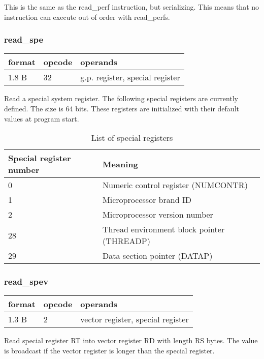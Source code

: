 \documentclass[forwardcom.tex]{subfiles}
\begin{document}
This is the same as the read\_perf instruction, but serializing. This means that no instruction can execute out of order with read\_perfs.

\subsubsection{read\_spe}
\label{table:readSpeInstruction}
\begin{tabular}{|p{12mm}|p{12mm}|p{110mm}|}
\hline
\bfseries format & \bfseries opcode & \bfseries operands \\ \hline
1.8 B & 32 & g.p. register, special register \\ \hline
\end{tabular}
\vspace{2mm}

Read a special system register. The following special registers are currently defined. The size is 64 bits. These registers are initialized with their default values at program start.

\begin{longtable} {|p{15mm}|p{100mm}|}
\caption{List of special registers} 
\label{table:specialRegisters} \\
\endfirsthead
\endhead
\hline
\bfseries Special register number & \bfseries Meaning  \\
\hline
0 & Numeric control register (NUMCONTR)  \\
1 & Microprocessor brand ID  \\
2 & Microprocessor version number   \\
28 & Thread environment block pointer (THREADP)   \\
29 & Data section pointer (DATAP)  \\
\hline
\end{longtable}

\subsubsection{read\_spev}
\label{table:readSpevInstruction}
\begin{tabular}{|p{12mm}|p{12mm}|p{110mm}|}
\hline
\bfseries format & \bfseries opcode & \bfseries operands \\ \hline
1.3 B & 2 & vector register, special register \\ \hline
\end{tabular}
\vspace{2mm}

Read special register RT into vector register RD with length RS bytes. The value is broadcast if the vector register is longer than the special register. 
\vspace{2mm}
\end{document}
